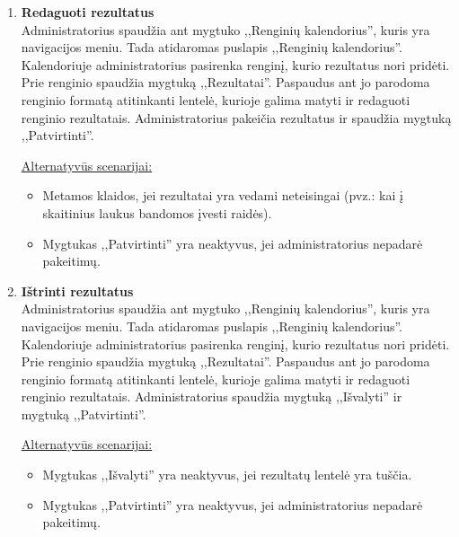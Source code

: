 \documentclass{VUMIFPSkursinis}
\begin{document}
\begin{enumerate} [label = \textbf{U\arabic*.}]
					\underline{Alternatyvūs scenarijai:}
					\begin{itemize}
						\item Metamos klaidos, jei rezultatai yra vedami neteisingai (pvz.: kai į skaitinius laukus bandomos įvesti raidės).
						\item Mygtukas ,,Rezultatai'' yra neaktyvus, jei renginys dar neprasidėjo.
						\item Mygtukas ,,Patvirtinti'' yra neaktyvus, jei administratorius rezultatų nesuvedė.
					\end{itemize}
					
			\item \textbf{Redaguoti rezultatus}   \\
					Administratorius spaudžia ant mygtuko ,,Renginių kalendorius'', kuris yra navigacijos meniu. Tada atidaromas puslapis ,,Renginių kalendorius''. Kalendoriuje administratorius pasirenka renginį, kurio rezultatus nori pridėti. Prie renginio spaudžia mygtuką ,,Rezultatai''. Paspaudus ant jo parodoma renginio formatą atitinkanti lentelė, kurioje galima matyti ir redaguoti renginio rezultatais. Administratorius pakeičia rezultatus ir spaudžia mygtuką ,,Patvirtinti''.
					
					\underline{Alternatyvūs scenarijai:}
					\begin{itemize}
						\item Metamos klaidos, jei rezultatai yra vedami neteisingai (pvz.: kai į skaitinius laukus bandomos įvesti raidės).
						\item Mygtukas ,,Patvirtinti'' yra neaktyvus, jei administratorius nepadarė pakeitimų.
					\end{itemize}
				
			\item \textbf{Ištrinti rezultatus}   \\
					Administratorius spaudžia ant mygtuko ,,Renginių kalendorius'', kuris yra navigacijos meniu. Tada atidaromas puslapis ,,Renginių kalendorius''. Kalendoriuje administratorius pasirenka renginį, kurio rezultatus nori pridėti. Prie renginio spaudžia mygtuką ,,Rezultatai''. Paspaudus ant jo parodoma renginio formatą atitinkanti lentelė, kurioje galima matyti ir redaguoti renginio rezultatais. Administratorius spaudžia mygtuką ,,Išvalyti'' ir mygtuką ,,Patvirtinti''.
					
					\underline{Alternatyvūs scenarijai:}
					\begin{itemize}
						\item Mygtukas ,,Išvalyti'' yra neaktyvus, jei rezultatų lentelė yra tuščia.
						\item Mygtukas ,,Patvirtinti'' yra neaktyvus, jei administratorius nepadarė pakeitimų.
					\end{itemize}
				

\end{enumerate}
\end{document}
